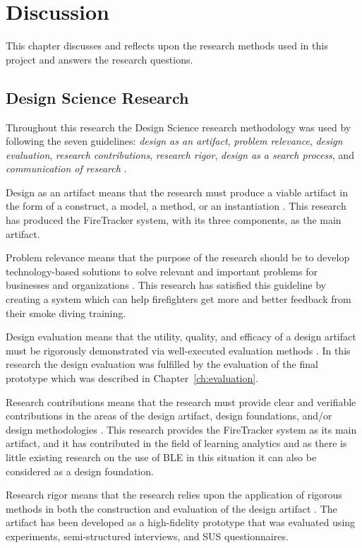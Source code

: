 \documentclass[../Main/thesis.tex]{subfiles}
\begin{document}
\chapter{Discussion}
\label{ch:discussion}
This chapter discusses and reflects upon the research methods used in this project and answers the research questions.

\section{Design Science Research}
Throughout this research the Design Science research methodology was used by following the seven guidelines: \textit{design as an artifact}, \textit{problem relevance}, \textit{design evaluation}, \textit{research contributions}, \textit{research rigor}, \textit{design as a search process}, and \textit{communication of research} \citep{hevner2004design}.

Design as an artifact means that the research must produce a viable artifact in the form of a construct, a model, a method, or an instantiation \citep{hevner2004design}.
This research has produced the FireTracker system, with its three components, as the main artifact.

Problem relevance means that the purpose of the research should be to develop technology-based solutions to solve relevant and important problems for businesses and organizations \citep{hevner2004design}.
This research has satisfied this guideline by creating a system which can help firefighters get more and better feedback from their smoke diving training.

Design evaluation means that the utility, quality, and efficacy of a design artifact must be rigorously demonstrated via well-executed evaluation methods \citep{hevner2004design}.
In this research the design evaluation was fulfilled by the evaluation of the final prototype which was described in Chapter~\ref{ch:evaluation}.

Research contributions means that the research must provide clear and verifiable contributions in the areas of the design artifact, design foundations, and/or design methodologies \citep{hevner2004design}.
This research provides the FireTracker system as its main artifact, and it has contributed in the field of learning analytics and as there is little existing research on the use of BLE in this situation it can also be considered as a design foundation.

Research rigor means that the research relies upon the application of rigorous methods in both the construction and evaluation of the design artifact \citep{hevner2004design}.
The artifact has been developed as a high-fidelity prototype that was evaluated using experiments, semi-structured interviews, and SUS questionnaires.
\end{document}
